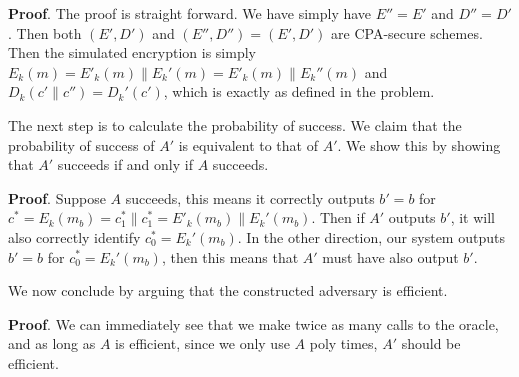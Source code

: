 \documentclass{article}
\begin{document}
\begin{enumerate}[,label=\alph*.]
\begin{mdbmarginx}{1ex}{0pt}{1ex}{0pt}%
\noindent{}\textbf{Proof}.  The proof is straight forward. We have simply have $E'' = E'$ and $D'' = D'$. Then both $(E',D')$ and
$(E'',D'') = (E',D')$ are CPA-secure schemes. Then the simulated encryption is simply
$E_k(m) = E'_k(m) \| E_k'(m) =  E'_k(m) \| E_k''(m)$ and $D_k(c' \| c'') = D_k'(c')$, which is exactly as
defined in the problem.
\mdfloatright{\ensuremath{\Box}}%
\end{mdbmarginx}%

The next step is to calculate the probability of success. We claim that the probability of success
of $A'$ is equivalent to that of $A'$. We show this by showing that $A'$ succeeds if and only if
$A$ succeeds.%

\begin{mdbmarginx}{1ex}{0pt}{1ex}{0pt}%
\noindent{}\textbf{Proof}.   Suppose $A$ succeeds, this means it correctly outputs $b' = b$ for $c^* = E_k(m_b) = c_1^* \| c_1^* = E'_k(m_b) \| E_k'(m_b)$.
 Then if $A'$ outputs $b'$, it will also correctly identify $c_0^* = E_k'(m_b)$. In the other direction,
 our system outputs $b' = b$ for $c_0^* = E_k'(m_b)$, then this means that $A'$ must have also output
 $b'$.
\mdfloatright{\ensuremath{\Box}}%
\end{mdbmarginx}%

We now conclude by arguing that the constructed adversary is efficient.%

\begin{mdbmarginx}{1ex}{0pt}{1ex}{0pt}%
\noindent{}\textbf{Proof}.  We can immediately see that we make twice as many calls to the oracle, and as long as $A$ is efficient,
since we only use $A$ poly times, $A'$ should be efficient.
\mdfloatright{\ensuremath{\Box}}%
\end{mdbmarginx}%


\end{enumerate}
\end{document}
